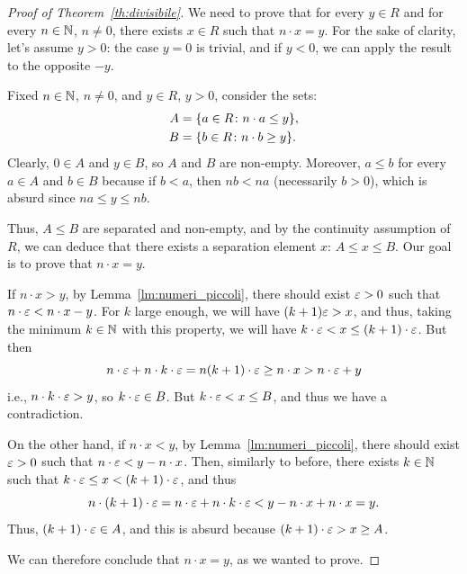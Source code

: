 %
\begin{proof}[Proof of Theorem~\ref{th:divisibile}]
    We need to prove that for every $y\in R$ and for every $n\in {\mathbb N}$, $n\neq
  0$, there exists $x\in R$ such that $n\cdot x=y$. For the sake of clarity,
  let's assume $y>0$: the case $y=0$ is trivial, and if $y<0$, we can apply the
  result to the opposite $-y$.
  
  Fixed $n\in {\mathbb N}$, $n\neq 0$, and $y\in R$, $y>0$, consider the sets:
  \begin{align*}
    A &= {\left\{ a\in R\colon n\cdot a\le y \right\}},\\
    B &= {\left\{ b\in R\colon n\cdot b\ge y \right\}}.
  \end{align*}
    Clearly, $0\in A$ and $y\in B$, so $A$ and $B$ are non-empty. Moreover,
  $a\le b$ for every $a\in A$ and $b\in B$ because if $b < a$, then $nb < na$
  (necessarily $b>0$), which is absurd since $na \le y \le nb$.
  
    Thus, $A\le B$ are separated and non-empty, and by the continuity assumption
  of $R$, we can deduce that there exists a separation element $x$: $A\le x \le
  B$. Our goal is to prove that $n\cdot x=y$.

    If $n\cdot x > y$, by Lemma~\ref{lm:numeri_piccoli}, there should exist
  $\varepsilon>0$ such that $n\cdot \varepsilon < n\cdot x - y$. For $k$ large enough, we will
  have $(k+1)\varepsilon > x$, and thus, taking the minimum $k\in {\mathbb N}$ with this
  property, we will have
  $k\cdot \varepsilon < x \le (k+1)\cdot \varepsilon$. But then 
  \[
    n\cdot \varepsilon + n\cdot k\cdot \varepsilon
    = n(k+1)\cdot \varepsilon 
    \ge n\cdot x 
    > n\cdot \varepsilon + y 
  \]
    i.e., $n\cdot k\cdot \varepsilon > y$, so $k\cdot \varepsilon \in B$. But $k\cdot\varepsilon < x
  \le B$, and thus we have a contradiction.

    On the other hand, if $n\cdot x < y$, by Lemma~\ref{lm:numeri_piccoli},
  there should exist $\varepsilon>0$ such that $n\cdot \varepsilon < y-n\cdot x$. Then,
  similarly to before, there exists $k\in{\mathbb N}$ such that $k\cdot \varepsilon \le x <
  (k+1)\cdot \varepsilon$, and thus
  \[
    n\cdot (k+1) \cdot \varepsilon 
    = n\cdot \varepsilon + n \cdot k \cdot \varepsilon 
    < y - n\cdot x + n\cdot x 
    =y.  
  \]
    Thus, $(k+1)\cdot \varepsilon \in A$, and this is absurd because $(k+1)\cdot \varepsilon >
  x \ge A$.

  We can therefore conclude that $n\cdot x = y$, as we wanted to prove.
\end{proof}
%

